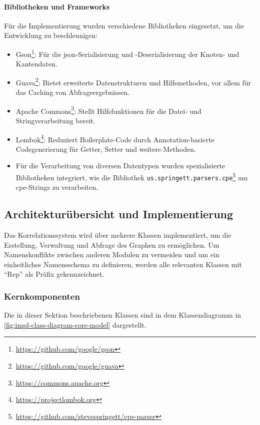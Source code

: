 \paragraph{Bibliotheken und Frameworks}

Für die Implementierung wurden verschiedene Bibliotheken eingesetzt, um die Entwicklung zu beschleunigen:

\begin{itemize}
    \itemsep0em
    \item Gson\footnote{\url{https://github.com/google/gson}}: Für die \acrshort{json}-Serialisierung und -Deserialisierung der Knoten- und Kantendaten.
    \item Guava\footnote{\url{https://github.com/google/guava}}: Bietet erweiterte Datenstrukturen und Hilfsmethoden, vor allem für das Caching von Abfrageergebnissen.
    \item Apache Commons\footnote{\url{https://commons.apache.org}}: Stellt Hilfsfunktionen für die Datei- und Stringverarbeitung bereit.
    \item Lombok\footnote{\url{https://projectlombok.org}}: Reduziert Boilerplate-Code durch Annotation-basierte Codegenerierung für Getter, Setter und weitere Methoden.
    \item Für die Verarbeitung von diversen Datentypen wurden spezialisierte Bibliotheken integriert, wie die Bibliothek \texttt{us.springett.parsers.cpe}\footnote{\url{https://github.com/stevespringett/cpe-parser}} um \acrshort{cpe}-Strings zu verarbeiten.
\end{itemize}

\subsection{Architekturübersicht und Implementierung}\label{subsec:impl-arch-overview}

Das Korrelationssystem wird über mehrere Klassen implementiert, um die Erstellung, Verwaltung und Abfrage des Graphen zu ermöglichen.
Um Namenskonflikte zwischen anderen Modulen zu vermeiden und um ein einheitliches Namensschema zu definieren, werden alle relevanten Klassen mit \enquote{Rep} als Präfix gekennzeichnet.

\subsubsection{Kernkomponenten}

Die in dieser Sektion beschriebenen Klassen sind in dem Klassendiagramm in \autoref{fig:impl-class-diagram-core-model} dargestellt.

